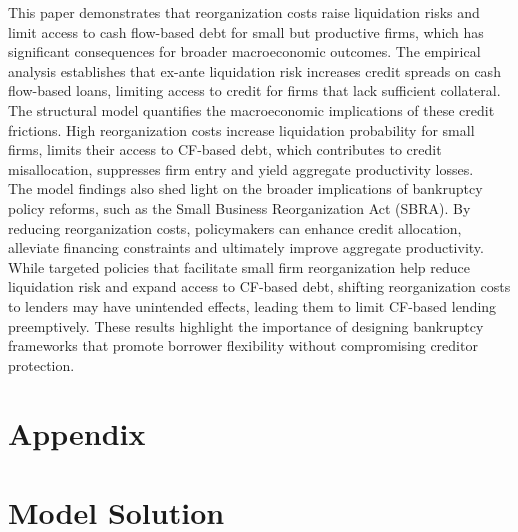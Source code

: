 \documentclass[12pt]{article}
\begin{document}
This paper demonstrates that reorganization costs raise liquidation risks and limit access to cash flow-based debt for small but productive firms, which has significant consequences for broader macroeconomic outcomes. The empirical analysis establishes that ex-ante liquidation risk increases credit spreads on cash flow-based loans, limiting access to credit for firms that lack sufficient collateral. The structural model quantifies the macroeconomic implications of these credit frictions. High reorganization costs increase liquidation probability for small firms, limits their access to CF-based debt, which contributes to credit misallocation, suppresses firm entry and yield aggregate productivity losses. \vspace{3mm} \\
The model findings also shed light on the broader implications of bankruptcy policy reforms, such as the Small Business Reorganization Act (SBRA). By reducing reorganization costs, policymakers can enhance credit allocation, alleviate financing constraints and ultimately improve aggregate productivity. While targeted policies that facilitate small firm reorganization help reduce liquidation risk and expand access to CF-based debt, shifting reorganization costs to lenders may have unintended effects, leading them to limit CF-based lending preemptively. These results highlight the importance of designing bankruptcy frameworks that promote borrower flexibility without compromising creditor protection.

\newpage

\appendix
\section*{Appendix}
\section{Model Solution \label{sec: qualitative analysis}}
\end{document}
